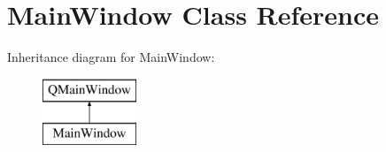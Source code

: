 \hypertarget{class_main_window}{\section{Main\+Window Class Reference}
\label{class_main_window}
}
Inheritance diagram for Main\+Window\+:\begin{figure}[H]
\begin{center}
\leavevmode
\includegraphics[height=2.000000cm]{class_main_window}
\end{center}
\end{figure}

